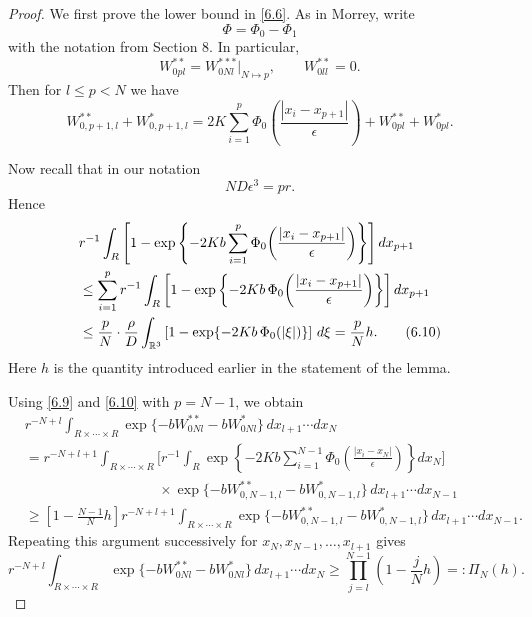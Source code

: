 \documentclass[10pt,a4paper]{amsart}
\begin{document}
\begin{proof}
We first prove the lower bound in \eqref{6.6}. As in Morrey, write
\[
\Phi=\Phi_0-\Phi_1
\]
with the notation from Section 8. In particular,
\[
W^{**}_{0pl}=W^{***}_{0Nl}\big|_{N\mapsto p},\qquad W^{**}_{0ll}=0.
\]
Then for $l\le p < N$ we have
\begin{equation}
W^{**}_{0,p+1,l}+W^{*}_{0,p+1,l}
=
2K\sum_{i=1}^p \Phi_0\!\left(\frac{|x_i-x_{p+1}|}{\epsilon}\right)
+
W^{**}_{0pl}+W^{*}_{0pl}.
\tag{6.9}\label{6.9}
\end{equation}

Now recall that in our notation
\[
ND\epsilon^3=pr.
\]
Hence
\begin{align}
&r^{-1}\int_R
\left[
1-\exp\left\{-2Kb\sum_{i=1}^p \Phi_0\!\left(\frac{|x_i-x_{p+1}|}{\epsilon}\right)\right\}
\right]dx_{p+1}
\notag\\
&\le
\sum_{i=1}^p
r^{-1}\int_R
\left[
1-\exp\left\{-2Kb\,\Phi_0\!\left(\frac{|x_i-x_{p+1}|}{\epsilon}\right)\right\}
\right]dx_{p+1}
\notag\\
&\le
\frac{p}{N}\cdot \frac{\rho}{D}
\int_{\mathbb R^3}
\left[1-\exp\{-2Kb\,\Phi_0(|\xi|)\}\right]\,d\xi
=
\frac{p}{N}h.
\tag{6.10}\label{6.10}
\end{align}
Here $h$ is the quantity introduced earlier in the statement of the lemma.

Using \eqref{6.9} and \eqref{6.10} with $p=N-1$, we obtain
\begin{align*}
&r^{-N+l}\int_{R\times\cdots\times R}
\exp\{-bW^{**}_{0Nl}-bW^{*}_{0Nl}\}\,dx_{l+1}\cdots dx_N
\\
&=
r^{-N+l+1}\int_{R\times\cdots\times R}
\Bigg[
r^{-1}\int_R
\exp\left\{-2Kb\sum_{i=1}^{N-1}\Phi_0\!\left(\frac{|x_i-x_N|}{\epsilon}\right)\right\}dx_N
\Bigg]
\\
&\hspace{4cm}\times
\exp\{-bW^{**}_{0,N-1,l}-bW^{*}_{0,N-1,l}\}\,dx_{l+1}\cdots dx_{N-1}
\\
&\ge
\left[1-\frac{N-1}{N}h\right]
r^{-N+l+1}
\int_{R\times\cdots\times R}
\exp\{-bW^{**}_{0,N-1,l}-bW^{*}_{0,N-1,l}\}\,dx_{l+1}\cdots dx_{N-1}.
\end{align*}
Repeating this argument successively for $x_N,x_{N-1},\dots,x_{l+1}$ gives
\begin{equation}
r^{-N+l}\int_{R\times\cdots\times R}
\exp\{-bW^{**}_{0Nl}-bW^{*}_{0Nl}\}\,dx_{l+1}\cdots dx_N
\ge
\prod_{j=l}^{N-1}\left(1-\frac{j}{N}h\right)
=: \Pi_N(h).
\tag{6.11}\label{6.11}
\end{equation}


\end{proof}
\end{document}
